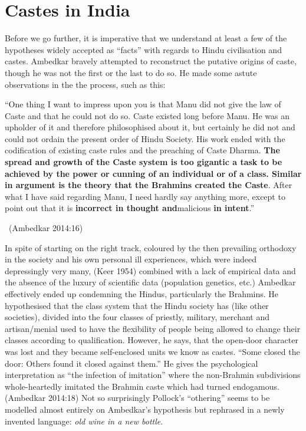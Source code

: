 \section*{Castes in India}

Before we go further, it is imperative that we understand at least a few of the hypotheses widely accepted as “facts” with regards to Hindu civilisation and castes. Ambedkar bravely attempted to reconstruct the putative origins of caste, though he was not the first or the last to do so. He made some astute observations in the the process, such as this:

\begin{myquote}
“One thing I want to impress upon you is that Manu did not give the law of Caste and that he could not do so. Caste existed long before Manu. He was an upholder of it and therefore philosophised about it, but certainly he did not and could not ordain the present order of Hindu Society. His work ended with the codification of existing caste rules and the preaching of Caste Dharma. \textbf{The spread and growth of the Caste system is too gigantic a task to be achieved by the power or cunning of an individual or of a class. Similar in argument is the theory that the Brahmins created the Caste}. After what I have said regarding Manu, I need hardly say anything more, except to point out that it is \textbf{incorrect in thought and}malicious \textbf{in intent}.” 

~\hfill (Ambedkar 2014:16)
\end{myquote}

In spite of starting on the right track, coloured by the then prevailing orthodoxy in the society and his own personal ill experiences, which were indeed depressingly very many, (Keer 1954) combined with a lack of empirical data and the absence of the luxury of scientific data (population genetics, etc.) Ambedkar effectively ended up condemning the Hindus, particularly the Brahmins. He hypothesised that the class system that the Hindu society has (like other societies), divided into the four classes of priestly, military, merchant and artisan/menial used to have the flexibility of people being allowed to change their classes according to qualification. However, he says, that the open-door character was lost and they became self-enclosed units we know as castes. “Some closed the door: Others found it closed against them.” He gives the psychological interpretation as “the infection of imitation” where the non-Brahmin subdivisions whole-heartedly imitated the Brahmin caste which had turned endogamous. (Ambedkar 2014:18) Not so surprisingly Pollock's “othering” seems to be modelled almost entirely on Ambedkar's hypothesis but rephrased in a newly invented language: \textit{old wine in a new bottle}.

